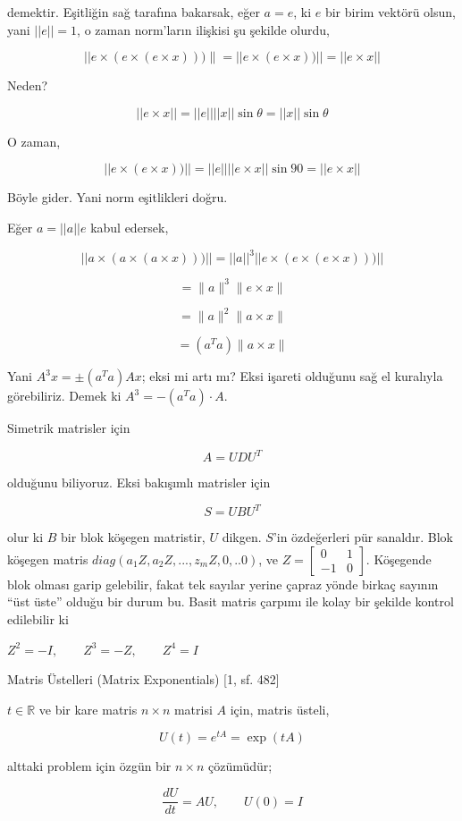 \documentclass[12pt,fleqn]{article}\usepackage{../../common}
\begin{document}
demektir. Eşitliğin sağ tarafına bakarsak, eğer $a=e$, ki $e$ bir birim vektörü
olsun, yani $||e||=1$, o zaman norm'ların ilişkisi şu şekilde olurdu,

$$||e\times(e\times (e\times x)))\|=||e\times (e\times x))|| =||e\times x||$$

Neden? 

$$ ||e \times x|| = ||e||||x|| \sin \theta = ||x|| \sin \theta$$

O zaman,

$$||e\times (e\times x))|| = ||e|||| e \times x|| \sin 90 = ||e \times x||$$

Böyle gider. Yani norm eşitlikleri doğru. 

Eğer $a = ||a||e$ kabul edersek,

$$||a\times(a\times (a\times x)))|| = ||a||^3 ||e\times(e\times (e\times x)))||$$

$$ =\|a\|^3\|e\times x\| $$

$$ =\|a\|^2\|a\times x\| $$

$$ =(a^Ta)\|a\times x\| $$

Yani $A^3x = \pm (a^Ta) Ax$; eksi mi artı mı? Eksi işareti olduğunu sağ el
kuralıyla görebiliriz. Demek ki $A^3 = -(a^Ta) \cdot A$. 

Simetrik matrisler için 

$$ A = UDU^T $$ 

olduğunu biliyoruz. Eksi bakışımlı matrisler için 

$$ S = UBU^T $$

olur ki $B$ bir blok köşegen matristir, $U$ dikgen. $S$'in özdeğerleri pür
sanaldır. Blok köşegen matris $diag(a_1Z,a_2Z,...,z_mZ,0,..0)$, ve $Z =
\left[\begin{array}{cc} 0 & 1 \\ -1 & 0 \end{array}\right]$. 
Köşegende blok olması garip gelebilir, fakat tek sayılar yerine çapraz
yönde birkaç sayının ``üst üste'' olduğu bir durum bu. Basit matris
çarpımı ile kolay bir şekilde kontrol edilebilir ki

$Z^2 = -I, \qquad Z^3 = -Z, \qquad Z^4 = I$

Matris Üstelleri (Matrix Exponentials) [1, sf. 482]

$t \in \mathbb{R}$ ve bir kare matris $n \times n$ matrisi $A$ için, matris üsteli,

$$ U(t) = e^{tA} = \exp(tA) $$

alttaki problem için özgün bir $n \times n$ çözümüdür;

$$ \frac{dU}{dt} = AU, \qquad U(0) = I $$
\end{document}
